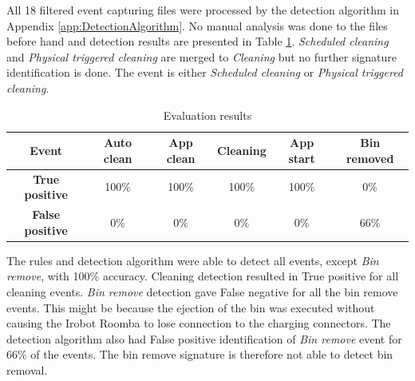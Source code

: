 All 18 filtered event capturing files were processed by the detection algorithm in Appendix \ref{app:DetectionAlgorithm}. No manual analysis was done to the files before hand and detection results are presented in Table \ref{tab:Evaluation results}. \textit{Scheduled cleaning} and \textit{Physical triggered cleaning} are merged to \textit{Cleaning} but no further signature identification is done. The event is either \textit{Scheduled cleaning} or \textit{Physical triggered cleaning}. 

\begin{table}[H]
\small
\centering
\caption{Evaluation results}
\label{tab:Evaluation results}
\begin{tabular}{|c|c|c|c|c|c|}
\hline
\textbf{Event}        & Auto clean & App clean & Cleaning & App start & Bin removed \\ \hline
\textbf{True positive} & 100\% & 100\%  & 100\% & 100\%  & 0\%         \\ \hline
\textbf{False positive} & 0\%  & 0\%  & 0\% & 0\%  & 66\%         \\ \hline

\end{tabular}
\end{table}

The rules and detection algorithm were able to detect all events, except \textit{Bin remove}, with 100\% accuracy. Cleaning detection resulted in True positive for all cleaning events. \textit{Bin remove} detection gave False negative for all the bin remove events. This might be because the ejection of the bin was executed without causing the Irobot Roomba to lose connection to the charging connectors. The detection algorithm also had False positive identification of \textit{Bin remove} event for 66\% of the events. The bin remove signature is therefore not able to detect bin removal. 




